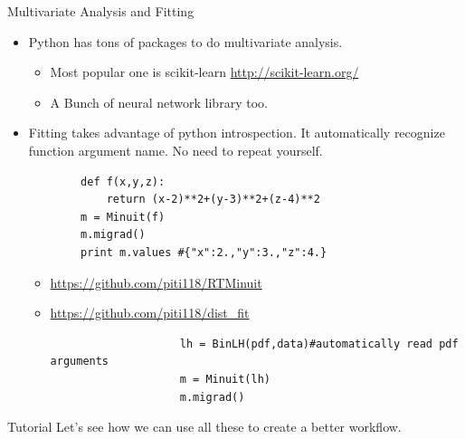 \documentclass{beamer}
\begin{document}
\begin{frame}[fragile]{Multivariate Analysis and Fitting}
	\begin{itemize}
	\item Python has tons of packages to do multivariate analysis.
		\begin{itemize}
			\item Most popular one is scikit-learn
				\url{http://scikit-learn.org/}
			\item A Bunch of neural network library too.
		\end{itemize}
	\item Fitting takes advantage of python introspection. It
	automatically recognize function argument name. No need to repeat
	yourself.
	\begin{verbatim}
		def f(x,y,z):
		    return (x-2)**2+(y-3)**2+(z-4)**2
		m = Minuit(f)
		m.migrad()
		print m.values #{"x":2.,"y":3.,"z":4.}
	\end{verbatim}
		\begin{itemize}
			\item \url{https://github.com/piti118/RTMinuit}
			\item \url{https://github.com/piti118/dist_fit}
				\begin{verbatim}
					lh = BinLH(pdf,data)#automatically read pdf arguments
					m = Minuit(lh)
					m.migrad()
				\end{verbatim}
		\end{itemize}
	\end{itemize}
\end{frame}


\begin{frame}[fragile]{Tutorial}
	Let's see how we can use all these to create a better workflow.
\end{frame}
\end{document}
